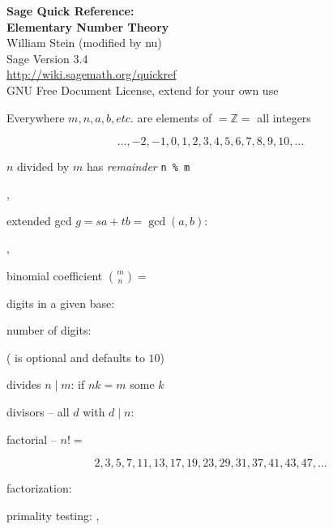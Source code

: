 \documentclass[a4paper]{article}
\newcommand{\ZZ}{\mathbb{Z}}
\begin{document}
\begin{multicols*}{3}
\begin{center}
\textbf{Sage Quick Reference:\\Elementary Number Theory}\\
William Stein (modified by nu)\\
Sage Version 3.4\\
\url{http://wiki.sagemath.org/quickref}\\
GNU Free Document License, extend for your own use\\
\end{center}
\vspace{-2ex}

\sect{}
Everywhere $m,n,a,b, etc.$ are elements of 
\BreakLineAndIndent
{} $=\ZZ = $ all integers 

\vspace{-2ex}
$$\ldots, -2, -1, 0, 1, 2, 3, 4, 5, 6, 7, 8, 9, 10, \ldots$$
\vspace{-4ex}

$n$ divided by $m$ has {\em remainder} {\ex \verb|n % m|}

, \EX{)}

extended gcd $g = sa + tb=\gcd(a,b)$: 

, \EX{)}

binomial coefficient $\binom{m}{n} = $ 

digits in a given base: \EX{)}

number of digits: \EX{)}

( is optional and defaults to $10$)

divides $n\mid m$:  if $nk=m$ some $k$

divisors -- all $d$ with $d\mid n$: 

factorial -- $n! = $ 


\vspace{-1ex}
$$2, 3, 5, 7, 11, 13, 17, 19, 23, 29, 31, 37, 41, 43, 47, \ldots$$
\vspace{-4ex}

factorization: 

primality testing: , 


\end{multicols*}
\end{document}
